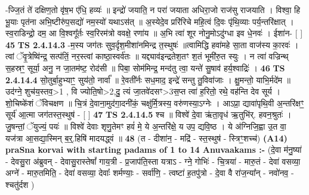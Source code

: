 \documentclass[17pt]{extarticle}
\begin{document}
                  -ज्जि॒तं ते॑ दक्षिण॒तो वृ॑ष॒भ ए॑धि॒ हव्यः॑ ॥ इन्द्रो॑ जयाति॒ न परा॑ जयाता अधिरा॒जो राज॑सु राजयाति । विश्वा॒ हि भू॒याः पृत॑ना अभि॒ष्टीरु॑प॒सद्यो॑ नम॒स्यो॑ यथाऽस॑त् ॥ अ॒स्येदे॒व प्ररि॑रिचे महि॒त्वं दि॒वः पृ॑थि॒व्याः पर्य॒न्तरि॑क्षात् । स्व॒राडिन्द्रो॒ दम॒ आ वि॒श्वगू᳚र्तः स्व॒रिरम॑त्रो ववक्षे॒ रणा॑य ॥ अ॒भि त्वा॑ शूर नोनु॒मोऽदु॑ग्धा इव धे॒नवः॑ । ईशा॑न- [  ] \textbf{  45} \newline
                  \newline
                                \textbf{ TS 2.4.14.3} \newline
                  -म॒स्य जग॑तः सुव॒र्दृश॒मीशा॑नमिन्द्र त॒स्थुषः॑ ॥त्वामिद्धि हवा॑महे सा॒ता वाज॑स्य का॒रवः॑ । त्वां ॅवृ॒त्रेष्वि॑न्द्र॒ सत्प॑तिं॒ नर॒स्त्वां काष्ठा॒स्वर्व॑तः ॥ यद्द्याव॑इन्द्रतेश॒तꣳ श॒तं भूमी॑रु॒त स्युः । न त्वा॑ वज्रिन्थ् स॒हस्रꣳ॒॒ सूर्या॒ अनु॒ न जा॒तम॑ष्ट॒ रोद॑सी ॥ पिबा॒ सोम॑मिन्द्र॒ मन्द॑तु त्वा॒ यन्ते॑ सु॒षाव॑ हर्य॒श्वाद्रिः॑ । \textbf{  46} \newline
                  \newline
                                \textbf{ TS 2.4.14.4} \newline
                  सो॒तुर्बा॒हुभ्याꣳ॒॒ सुय॑तो॒ नार्वा᳚ ॥ रे॒वती᳚र्नः सध॒माद॒ इन्द्रे॑ सन्तु तु॒विवा॑जाः । क्षु॒मन्तो॒ याभि॒र्मदे॑म ॥ उद॑ग्ने॒ शुच॑य॒स्तव॒>1 , वि ज्योति॒षो>2,दु॒ त्यं जा॒तवे॑दसꣳ>3स॒प्त त्वा॑ ह॒रितो॒ रथे॒ वह॑न्ति देव सूर्य । शो॒चिष्के॑शं ॅविचक्षण ॥ चि॒त्रं दे॒वाना॒मुद॑गा॒दनी॑कं॒ चक्षु॑र्मि॒त्रस्य॒ वरु॑णस्या॒ऽग्नेः । आऽप्रा॒ द्यावा॑पृथि॒वी अ॒न्तरि॑क्षꣳ॒॒ सूर्य॑ आ॒त्मा जग॑तस्त॒स्थुष॑ - [  ] \textbf{  47} \newline
                  \newline
                                \textbf{ TS 2.4.14.5} \newline
                  श्च ॥ विश्वे॑ दे॒वा ऋ॑ता॒वृध॑ ऋ॒तुभि॑र्. हवन॒श्रुतः॑ । जु॒षन्तां॒ ॅयुज्यं॒ पयः॑ ॥ विश्वे॑ देवाः शृणु॒तेमꣳ हवं॑ मे॒ ये अ॒न्तरि॑क्षे॒ य उप॒ द्यवि॒ष्ठ । ये अ॑ग्निजि॒ह्वा उ॒त वा॒ यज॑त्रा आ॒सद्या॒स्मिन् ब॒र्॒.हिषि॑ मादयद्ध्वं ॥ \textbf{  48} \newline
                  \newline
                      (त - दीशा॑न॒ - मद्रि॑ - स्त॒स्थुष॑ - स्त्रिꣳ॒॒शच्च॑)  \textbf{(A14)} \newline \newline
                \textbf{praSna korvai with starting padams of 1 to 14 Anuvaakams :-} \newline
        (दे॒वा म॑नु॒ष्या॑ - देवसु॒रा अ॑ब्रुवन् - देवासु॒रास्तेषां᳚ गाय॒त्री - प्र॒जाप॑ति॒स्ता यत्राऽ - ग्ने॒ गोभिः॑ - चि॒त्रया॑ - मारु॒तं - देवा॑ वसव्या॒ अग्ने॑ - मारु॒तमिति॒ - देवा॑ वसव्या॒ देवाः᳚ शर्मण्याः॒ - सर्वा॑णि॒ - त्वष्टा॑ ह॒तपु॑त्रो - दे॒वा वै रा॑ज॒न्या᳚न् - नवो॑नव॒ - श्चतु॑र्दश ) \newline
\end{document}
